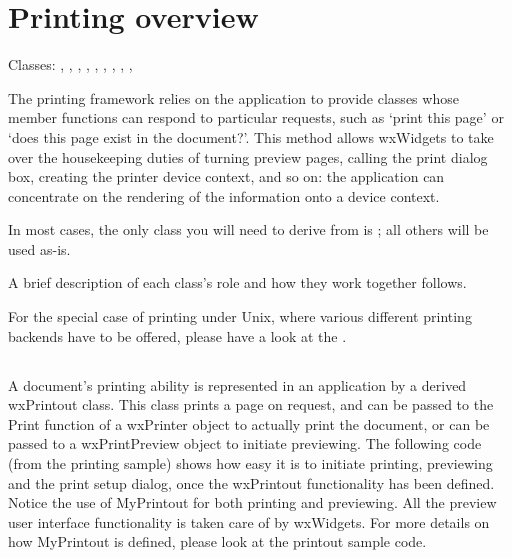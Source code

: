 \section{Printing overview}\label{printingoverview}

Classes: , 
, 
, 
, 
, 
, 
, 
, 
, 

The printing framework relies on the application to provide classes whose member
functions can respond to particular requests, such as `print this page' or `does
this page exist in the document?'. This method allows wxWidgets to take over the
housekeeping duties of turning preview pages, calling the print dialog box,
creating the printer device context, and so on: the application can concentrate
on the rendering of the information onto a device context.

In most cases, the only class you will need to derive from is
; all others will be used as-is.

A brief description of each class's role and how they work together follows.

For the special case of printing under Unix, where various different
printing backends have to be offered, please have a look at the
.

\subsection{}

A document's printing ability is represented in an application by a derived
wxPrintout class. This class prints a page on request, and can be passed to the
Print function of a wxPrinter object to actually print the document, or can be
passed to a wxPrintPreview object to initiate previewing. The following code
(from the printing sample) shows how easy it is to initiate printing, previewing
and the print setup dialog, once the wxPrintout functionality has been defined.
Notice the use of MyPrintout for both printing and previewing. All the preview
user interface functionality is taken care of by wxWidgets. For more details on how
MyPrintout is defined, please look at the printout sample code.

